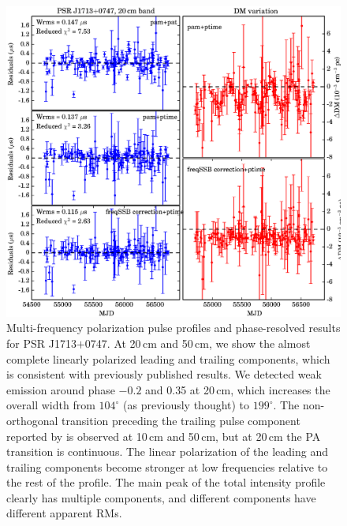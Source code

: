 \documentclass[useAMS,usenatbib]{mn2e}
\begin{document}
\begin{appendix}
\begin{figure}
\begin{center}
\includegraphics[width=6 in]{1713.ps}
\caption{Multi-frequency polarization pulse profiles and phase-resolved results for PSR J1713$+$0747. 
At 20\,cm and 50\,cm, we show the almost complete linearly polarized leading and trailing components, 
which is consistent with previously published results.
%
We detected weak emission around phase $-0.2$ and 0.35 at 20\,cm, which 
increases the overall width from $104^{\circ}$ (as previously thought) to 
$199^{\circ}$. 
%
The non-orthogonal transition preceding the trailing pulse component reported 
by \citet{Yan11} is observed at 10\,cm and 50\,cm, but at 20\,cm 
the PA transition is continuous.
%
The linear polarization of the leading and trailing components become stronger 
at low frequencies relative to the rest of the profile.
%
The main peak of the total intensity profile clearly has multiple components, and different 
components have different apparent RMs.
}
\label{1713}
\end{center}
\end{figure}


\end{appendix}
\end{document}
